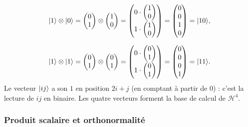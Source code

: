 \begin{align*}
  |1\rangle\otimes|0\rangle&=\begin{pmatrix}0\\ 1\end{pmatrix}\otimes\begin{pmatrix}1\\ 0\end{pmatrix}
    =\begin{pmatrix}0\cdot\begin{pmatrix}1\\ 0\end{pmatrix}\\[1.5ex]1\cdot\begin{pmatrix}1\\ 0\end{pmatrix}\end{pmatrix}
    =\begin{pmatrix}0\\ 0\\ 1\\ 0\end{pmatrix}=|10\rangle,\\[1.5ex]
  |1\rangle\otimes|1\rangle&=\begin{pmatrix}0\\ 1\end{pmatrix}\otimes\begin{pmatrix}0\\ 1\end{pmatrix}
    =\begin{pmatrix}0\cdot\begin{pmatrix}0\\ 1\end{pmatrix}\\[1.5ex]1\cdot\begin{pmatrix}0\\ 1\end{pmatrix}\end{pmatrix}
    =\begin{pmatrix}0\\ 0\\ 0\\ 1\end{pmatrix}=|11\rangle.
\end{align*}
Le vecteur $|ij\rangle$ a son $1$ en position $2i+j$ (en comptant à partir de $0$) : c'est
la lecture de $ij$ en binaire. Les quatre vecteurs forment la base de calcul de
$\mathcal{H}^4$.

\subsubsection{Produit scalaire et orthonormalité}

